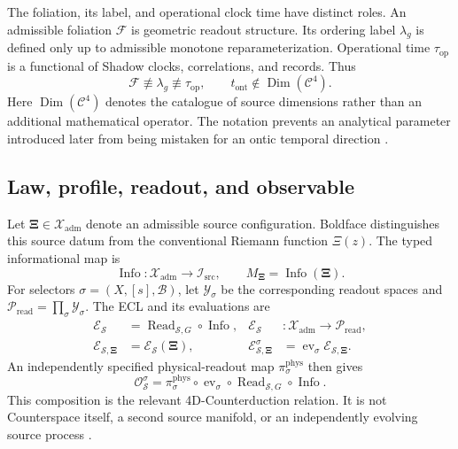 \documentclass[11pt,letterpaper]{article}
\numberwithin{equation}{section}
\theoremstyle{definition}
\theoremstyle{remark}
\newcommand{\CS}{\mathcal C}
\newcommand{\ES}{\mathcal E_{\mathcal S}}
\newcommand{\src}{\boldsymbol\Xi}
\DeclareMathOperator{\Dim}{Dim}
\DeclareMathOperator{\Info}{Info}
\DeclareMathOperator{\Read}{Read}
\DeclareMathOperator{\ev}{ev}
\begin{document}
The foliation, its label, and operational clock time have distinct roles. An admissible foliation $\mathcal F$ is geometric readout structure. Its ordering label $\lambda_g$ is defined only up to admissible monotone reparameterization. Operational time $\tau_{\mathrm{op}}$ is a functional of Shadow clocks, correlations, and records. Thus
\begin{equation}
 \mathcal F\not\equiv\lambda_g\not\equiv\tau_{\mathrm{op}},
 \qquad t_{\mathrm{ont}}\notin\Dim(\CS^4).
 \label{eq:time}
\end{equation}
Here $\Dim(\CS^4)$ denotes the catalogue of source dimensions rather than an additional mathematical operator. The notation prevents an analytical parameter introduced later from being mistaken for an ontic temporal direction \cite{tcgsfoundation}.

\subsection{Law, profile, readout, and observable}
Let $\src\in\mathcal X_{\mathrm{adm}}$ denote an admissible source configuration. Boldface distinguishes this source datum from the conventional Riemann function $\Xi(z)$. The typed informational map is
\begin{equation}
 \Info:\mathcal X_{\mathrm{adm}}\longrightarrow\mathcal I_{\mathrm{src}},
 \qquad M_{\src}=\Info(\src).
\end{equation}
For selectors $\sigma=(X,[s],\mathcal B)$, let $\mathcal Y_\sigma$ be the corresponding readout spaces and $\mathcal P_{\mathrm{read}}=\prod_\sigma\mathcal Y_\sigma$. The ECL and its evaluations are
\begin{align}
 \ES&=\Read_{\mathcal S,G}\circ\Info,
       &\ES&:\mathcal X_{\mathrm{adm}}\to\mathcal P_{\mathrm{read}},\label{eq:ecl}\\
 \mathcal E_{\mathcal S,\src}&=\ES(\src),
       &\mathcal E^\sigma_{\mathcal S,\src}&=\ev_\sigma\mathcal E_{\mathcal S,\src}.
\end{align}
An independently specified physical-readout map $\pi^{\mathrm{phys}}_\sigma$ then gives
\begin{equation}
 \mathcal O^\sigma_{\mathcal S}
 =\pi^{\mathrm{phys}}_\sigma\circ\ev_\sigma\circ\Read_{\mathcal S,G}\circ\Info.
 \label{eq:counterduction}
\end{equation}
This composition is the relevant 4D-Counterduction relation. It is not Counterspace itself, a second source manifold, or an independently evolving source process \cite{tcgsfoundation,tcgsoperator}.
\end{document}
